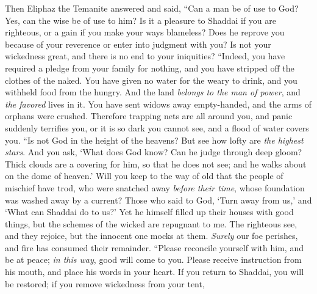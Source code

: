 \begin{biblechapter} %
 Then Eliphaz the Temanite answered and said,
\verse “Can a man be of use to God? 
Yes, can the wise be of use to him?
\verse Is it a pleasure to Shaddai if you are righteous, 
or a gain if you make your ways blameless?
\verse Does he reprove you because of your reverence 
or enter into judgment with you?
\verse Is not your wickedness great, 
and there is no end to your iniquities?
\verse “Indeed, you have required a pledge from your family for nothing, 
and you have stripped off the clothes of the naked.
\verse You have given no water for the weary to drink, 
and you withheld food from the hungry.
\verse And the land \textit{belongs to the man of power}, 
and \textit{the favored} lives in it.
\verse You have sent widows away empty-handed, 
and the arms of orphans were crushed.
\verse Therefore trapping nets are all around you, 
and panic suddenly terrifies you,
\verse or it is so dark you cannot see, 
and a flood of water covers you.
\verse “Is not God in the height of the heavens? 
But see how lofty are \textit{the highest stars}.
\verse And you ask, ‘What does God know? 
Can he judge through deep gloom?
\verse Thick clouds are a covering for him, so that he does not see; 
and he walks about on the dome of heaven.’
\verse Will you keep to the way of old 
that the people of mischief have trod,
\verse who were snatched away \textit{before their time}, 
whose foundation was washed away by a current?
\verse Those who said to God, ‘Turn away from us,’ 
and ‘What can Shaddai do to us?’
\verse Yet he himself filled up their houses with good things, 
but the schemes of the wicked are repugnant to me.
\verse The righteous see, and they rejoice, 
but the innocent one mocks at them.
\verse \textit{Surely} our foe perishes, 
and fire has consumed their remainder.
\verse “Please reconcile yourself with him, 
and be at peace; \textit{in this way}, good will come to you.
\verse Please receive instruction from his mouth, 
and place his words in your heart.
\verse If you return to Shaddai, you will be restored; 
if you remove wickedness from your tent,

\end{biblechapter}
